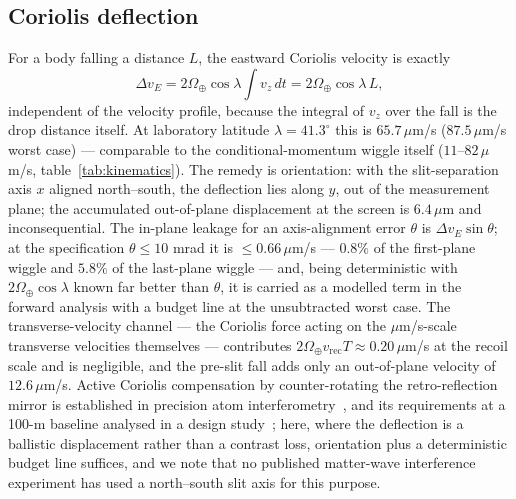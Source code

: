 \documentclass[11pt,a4paper]{article}
\begin{document}
\subsection{Coriolis deflection}
\label{sec:coriolis}
For a body falling a distance $L$, the eastward Coriolis velocity is exactly
\begin{equation}
\Delta v_E = 2\Omega_\oplus\cos\lambda \int v_z\,dt = 2\Omega_\oplus\cos\lambda\,L,
\label{eq:coriolis}
\end{equation}
independent of the velocity profile, because the integral of $v_z$ over the fall is the drop distance itself. At laboratory latitude $\lambda = 41.3^\circ$ this is $65.7\,\mu$m/s ($87.5\,\mu$m/s worst case) --- comparable to the conditional-momentum wiggle itself ($11$--$82\,\mu$m/s, table~\ref{tab:kinematics}). The remedy is orientation: with the slit-separation axis $x$ aligned north--south, the deflection lies along $y$, out of the measurement plane; the accumulated out-of-plane displacement at the screen is $6.4\,\mu$m and inconsequential. The in-plane leakage for an axis-alignment error $\theta$ is $\Delta v_E\sin\theta$; at the specification $\theta \leq 10$ mrad it is $\leq 0.66\,\mu$m/s --- $0.8\%$ of the first-plane wiggle and $5.8\%$ of the last-plane wiggle --- and, being deterministic with $2\Omega_\oplus\cos\lambda$ known far better than $\theta$, it is carried as a modelled term in the forward analysis with a budget line at the unsubtracted worst case. The transverse-velocity channel --- the Coriolis force acting on the $\mu$m/s-scale transverse velocities themselves --- contributes $2\Omega_\oplus v_\text{rec}T \approx 0.20\,\mu$m/s at the recoil scale and is negligible, and the pre-slit fall adds only an out-of-plane velocity of $12.6\,\mu$m/s. Active Coriolis compensation by counter-rotating the retro-reflection mirror is established in precision atom interferometry~\cite{Lan2012}, and its requirements at a 100-m baseline analysed in a design study~\cite{Glick2024}; here, where the deflection is a ballistic displacement rather than a contrast loss, orientation plus a deterministic budget line suffices, and we note that no published matter-wave interference experiment has used a north--south slit axis for this purpose.
\end{document}

